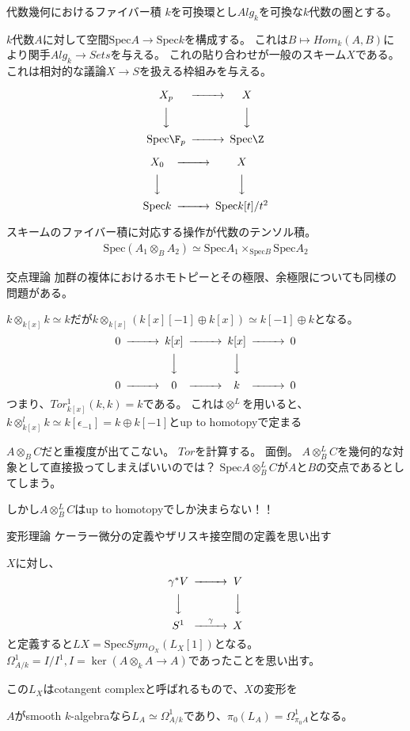 \documentclass[dvipdfmx]{beamer}
\newcommand{\spec}{\mathrm{Spec}}
\begin{document}
\begin{frame}{代数幾何におけるファイバー積}
$k$を可換環とし$Alg_k$を可換な$k$代数の圏とする。

$k$代数$A$に対して空間$\spec A \to \spec k$を構成する。
これは$B \mapsto Hom_{k}(A,B)$により関手$Alg_k \to Sets$を与える。
これの貼り合わせが一般のスキーム$X$である。
これは相対的な議論$X\to S$を扱える枠組みを与える。
\begin{multicols}{2}
\[
\begin{CD}
X_p@>>>X\\
@VVV@VVV\\
\spec\F_p@>>>\spec\Z
\end{CD}
\]

\[
\begin{CD}
X_0@>>>X\\
@VVV@VVV\\
\spec k@>>>\spec k[t]/t^2
\end{CD}
\]
\end{multicols}

スキームのファイバー積に対応する操作が代数のテンソル積。
\begin{align*}
\spec(A_1\otimes_BA_2)\simeq \spec A_1\times_{\spec B}\spec A_2
\end{align*}
\end{frame}

\begin{frame}{交点理論}
加群の複体におけるホモトピーとその極限、余極限についても同様の問題がある。

$k\otimes_{k[x]}k\simeq k$だが$k\otimes_{k[x]}(k[x][-1]\oplus k[x])\simeq k[-1]\oplus k$となる。
\[
\begin{CD}
0@>>>k[x]@>>>k[x]@>>>0\\
@.@VVV@VVV@.\\
0@>>>0@>>>k@>>>0
\end{CD}
\]
つまり、$Tor^1_{k[x]}(k,k)=k$である。
これは$\otimes^L$を用いると、
$k\otimes^l_{k[x]}k\simeq k[\epsilon_{-1}]=k\oplus k[-1]$とup to homotopyで定まる

$A\otimes_BC$だと重複度が出てこない。
$Tor$を計算する。
面倒。
$A\otimes^L_BC$を幾何的な対象として直接扱ってしまえばいいのでは？
$\spec A\otimes^L_BC$が$A$と$B$の交点であるとしてしまう。

しかし$A\otimes^L_BC$はup to homotopyでしか決まらない！！
\end{frame}

\begin{frame}{変形理論}
ケーラー微分の定義やザリスキ接空間の定義を思い出す

$X$に対し、
\[
\begin{CD}
\gamma^*V@>>>V\\
@VVV@VVV\\
S^1@>\gamma>>X
\end{CD}
\]
と定義すると$LX=\spec Sym_{O_X}(L_X[1])$となる。
$\Omega^1_{A/k}=I/I^1, I=\ker(A\otimes_kA \to A)$であったことを思い出す。

この$L_X$はcotangent complexと呼ばれるもので、$X$の変形を

$A$がsmooth $k$-algebraなら$L_A\simeq \Omega^1_{A/k}$であり、$\pi_0(L_A)=\Omega^1_{\pi_0A}$となる。
\end{frame}
\end{document}
